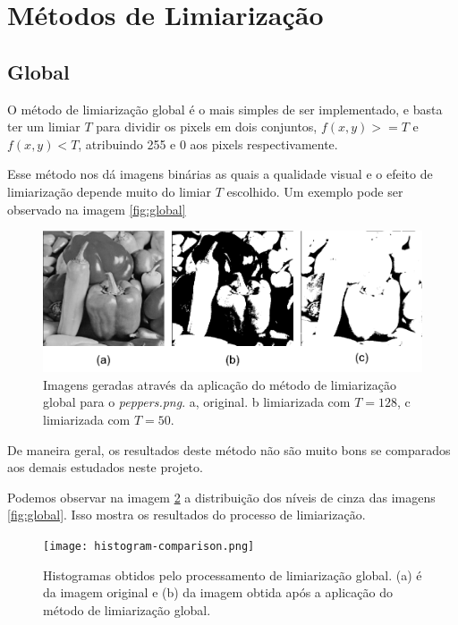 \documentclass[conference]{IEEEtran}
\begin{document}
\section{Métodos de Limiarização}

\subsection{Global}

    O método de limiarização global é o mais simples de ser implementado, e basta ter um limiar $T$ para dividir os pixels em dois conjuntos, $f(x,y) >= T$ e $f(x, y) < T$, atribuindo 255 e 0 aos pixels respectivamente.

    Esse método nos dá imagens binárias as quais a qualidade visual e o efeito de limiarização depende muito do limiar $T$ escolhido. Um exemplo pode ser observado na imagem \ref{fig:global}

    \begin{figure}[ht]
        \centering
        \includegraphics[width=\linewidth]{global.png}
        \caption{Imagens geradas através da aplicação do método de limiarização global para o \textit{peppers.png}. a, original. b limiarizada com $T=128$, c limiarizada com $T=50$.}
        \label{fig:gobal}
    \end{figure}

    De maneira geral, os resultados deste método não são muito bons se comparados aos demais estudados neste projeto.

    Podemos observar na imagem \ref{fig:histo-comp} a distribuição dos níveis de cinza das imagens \ref{fig:global}. Isso mostra os resultados do processo de limiarização.

    \begin{figure}[ht]
        \centering
        \texttt{[image: histogram-comparison.png]}
        \caption{Histogramas obtidos pelo processamento de limiarização global. (a) é da imagem original e (b) da imagem obtida após a aplicação do método de limiarização global.}
        \label{fig:histo-comp}
    \end{figure}
\end{document}
